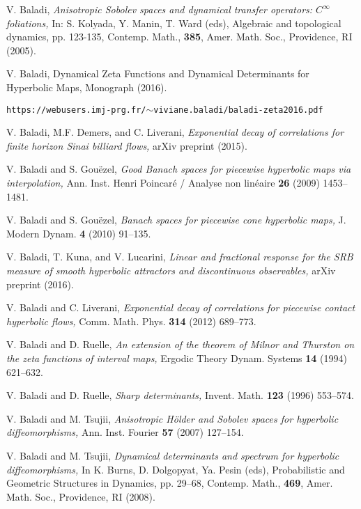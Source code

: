\documentclass[10pt,twoside]{amsart}
\begin{document}
 \begin{thebibliography}{KKPW}

 V. Baladi, 
{\it Anisotropic Sobolev spaces and dynamical transfer operators: $C^\infty$ foliations,} 
In: S. Kolyada, Y. Manin, T.  Ward (eds),
Algebraic and topological dynamics,  pp. 123-135, Contemp. Math., \textbf{385}, Amer. Math. Soc., Providence, RI (2005).

 V. Baladi,  Dynamical Zeta Functions and Dynamical Determinants for Hyperbolic Maps, Monograph (2016).

{\tt https://webusers.imj-prg.fr/$\sim$viviane.baladi/baladi-zeta2016.pdf}

 V. Baladi,
M.F. Demers, and C. Liverani, {\it Exponential decay of correlations for  finite horizon Sinai billiard flows,}
arXiv preprint (2015).

 V. Baladi and S. Gou\"ezel,
{\it Good Banach spaces for piecewise hyperbolic maps via interpolation,}   Ann. Inst. Henri Poincar\'e / Analyse non lin\'eaire 
\textbf{26} (2009)
1453--1481.

 V. Baladi and S. Gou\"ezel, 
{\it Banach spaces for piecewise cone hyperbolic maps,}  J. Modern Dynam.
\textbf{4} (2010) 91--135.

 V.  Baladi, T. Kuna,  and V. Lucarini, 
{\it Linear and fractional response for the SRB measure of smooth hyperbolic attractors and discontinuous observables,} arXiv preprint (2016).


V. Baladi and C. Liverani, 
{\it Exponential
decay of correlations for  piecewise  contact hyperbolic flows,}
Comm. Math. Phys. \textbf{314} (2012) 689--773.

V. Baladi and D.  Ruelle,  {\it An extension of the theorem of Milnor and Thurston on the zeta functions of interval maps,} Ergodic Theory Dynam. Systems 
\textbf{14} (1994)  621--632.

V. Baladi and D.  Ruelle,  {\it Sharp determinants,}
Invent. Math. \textbf{123} (1996) 553--574.

 V. Baladi and M. Tsujii,
{\it Anisotropic H\"older and Sobolev spaces for hyperbolic diffeomorphisms,}  Ann. Inst. Fourier \textbf{57} (2007) 127--154.


V. Baladi and M.  Tsujii,  {\it Dynamical determinants and spectrum for hyperbolic diffeomorphisms,}
In K. Burns, D. Dolgopyat, Ya.   Pesin  (eds),
Probabilistic and Geometric Structures in Dynamics, pp. 29--68,
Contemp. Math., \textbf{469}, Amer. Math. Soc.,  Providence, RI (2008).



\end{thebibliography}
\end{document}
